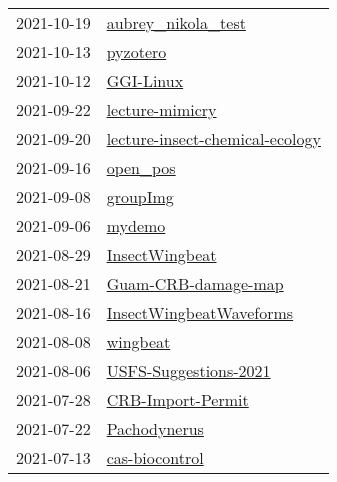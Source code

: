 \begin{longtable}{ll}
2021-10-19 &                                     \href{https://github.com/aubreymoore/aubrey_nikola_test}{aubrey_nikola_test} \\
2021-10-13 &                                                         \href{https://github.com/aubreymoore/pyzotero}{pyzotero} \\
2021-10-12 &                                                       \href{https://github.com/aubreymoore/GGI-Linux}{GGI-Linux} \\
2021-09-22 &                                           \href{https://github.com/aubreymoore/lecture-mimicry}{lecture-mimicry} \\
2021-09-20 &           \href{https://github.com/aubreymoore/lecture-insect-chemical-ecology}{lecture-insect-chemical-ecology} \\
2021-09-16 &                                                         \href{https://github.com/aubreymoore/open_pos}{open_pos} \\
2021-09-08 &                                                         \href{https://github.com/aubreymoore/groupImg}{groupImg} \\
2021-09-06 &                                                             \href{https://github.com/aubreymoore/mydemo}{mydemo} \\
2021-08-29 &                                             \href{https://github.com/aubreymoore/InsectWingbeat}{InsectWingbeat} \\
2021-08-21 &                                   \href{https://github.com/aubreymoore/Guam-CRB-damage-map}{Guam-CRB-damage-map} \\
2021-08-16 &                           \href{https://github.com/aubreymoore/InsectWingbeatWaveforms}{InsectWingbeatWaveforms} \\
2021-08-08 &                                                         \href{https://github.com/aubreymoore/wingbeat}{wingbeat} \\
2021-08-06 &                               \href{https://github.com/aubreymoore/USFS-Suggestions-2021}{USFS-Suggestions-2021} \\
2021-07-28 &                                       \href{https://github.com/aubreymoore/CRB-Import-Permit}{CRB-Import-Permit} \\
2021-07-22 &                                                 \href{https://github.com/aubreymoore/Pachodynerus}{Pachodynerus} \\
2021-07-13 &                                             \href{https://github.com/aubreymoore/cas-biocontrol}{cas-biocontrol} \\

\end{longtable}
